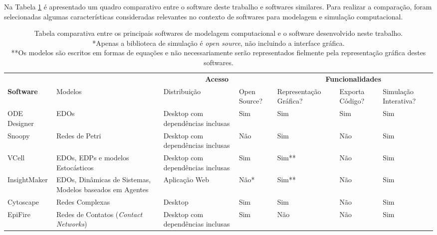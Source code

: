 \documentclass[
	12pt,				%
	openright,			%
	oneside,			%
	a4paper,			%
	main=brazil,
	english,			%
	]{ufsj-abntex2}
\begin{document}
Na Tabela \ref{tab:comparativo} é apresentado um quadro comparativo entre o software deste trabalho e softwares similares. Para realizar a comparação, foram selecionadas algumas características consideradas relevantes no contexto de softwares para modelagem e simulação computacional. 

\begin{landscape}
\begin{table}[h]
    \centering
        \begin{tabular}{m{}m{}m{}m{}m{}m{}m{}}
        \toprule
        \multicolumn{1}{c}{} & \multicolumn{1}{c}{} & \multicolumn{2}{c}{\textbf{Acesso}} & \multicolumn{3}{c}{\textbf{Funcionalidades}} \\
        \cmidrule(rl){3-4}\cmidrule(rl){5-7}
        \textbf{Software} & {Modelos} & {Distribuição} & {Open Source?} & {Representação Gráfica?} & {Exporta Código?} & {Simulação Interativa?} \\
        \midrule
        ODE Designer & EDOs & Desktop com dependências inclusas & Sim & Sim & Sim & Sim \\
        Snoopy & Redes de Petri & Desktop com dependências inclusas & Não & Sim & Não & Sim \\
        VCell & EDOs, EDPs e modelos Estocásticos & Desktop com dependências inclusas & Sim & Sim** & Não & Sim \\
        InsightMaker & EDOs, Dinâmicas de Sistemas, Modelos baseados em Agentes & Aplicação Web & Não* & Sim** & Não & Sim \\
        Cytoscape & Redes Complexas & Desktop & Sim & Sim & Não & Sim \\
        EpiFire & Redes de Contatos (\textit{Contact Networks}) & Desktop com dependências inclusas & Sim & Não & Não & Sim \\
        \bottomrule
    \end{tabular}
    \caption{Tabela comparativa entre os principais softwares de modelagem computacional e o software desenvolvido neste trabalho. \\ *Apenas a biblioteca de simulação é \textit{open source}, não incluindo a interface gráfica. \\ **Os modelos são escritos em formas de equações e não necessariamente serão representados fielmente pela representação gráfica destes softwares.}
    \label{tab:comparativo}
\end{table}
\end{landscape}
\end{document}
